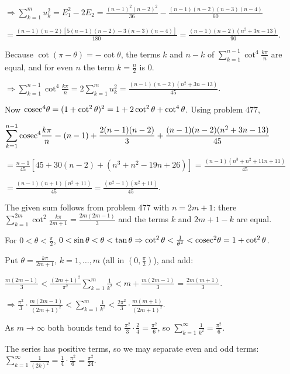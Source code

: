   $\Rightarrow\displaystyle\sum_{k = 1}^mu_k^2 = E_1^2 - 2E_2 = \frac{(n - 1)^2(n - 2)^2}{36} - \frac{(n -
    1)(n - 2)(n - 3)(n - 4)}{60}$

  $= \frac{(n - 1)(n - 2)[5(n - 1)(n - 2) - 3(n - 3)(n - 4)]}{180} = \frac{(n - 1)(n - 2)(n^2 + 3n -
    13)}{90}$.

  Because $\cot(\pi - \theta) = -\cot\theta$, the terms $k$ and $n - k$ of $\displaystyle\sum_{k = 1}^{n -
    1}\cot^4\frac{k\pi}{n}$ are equal, and for even $n$ the term $k = \frac{n}{2}$ is $0$.

  $\Rightarrow\displaystyle\sum_{k = 1}^{n - 1}\cot^4\frac{k\pi}{n} = 2\sum_{k = 1}^mu_k^2 = \frac{(n - 1)(n -
    2)(n^2 + 3n - 13)}{45}$.

  Now ${\rm cosec}^4\theta = (1 + \cot^2\theta)^2 = 1 + 2\cot^2\theta + \cot^4\theta$. Using problem 477,

  $\displaystyle\sum_{k = 1}^{n - 1}{\rm cosec}^4\frac{k\pi}{n} = (n - 1) + \frac{2(n - 1)(n - 2)}{3}
  + \frac{(n - 1)(n - 2)(n^2 + 3n - 13)}{45}$

  $= \frac{n - 1}{45}\left[45 + 30(n - 2) + (n^3 + n^2 - 19n + 26)\right] = \frac{(n - 1)(n^3 + n^2 + 11n +
    11)}{45}$

  $= \frac{(n - 1)(n + 1)(n^2 + 11)}{45} = \frac{(n^2 - 1)(n^2 + 11)}{45}$.
\item The given sum follows from problem 477 with $n = 2m + 1$: there $\displaystyle\sum_{k =
    1}^{2m}\cot^2\frac{k\pi}{2m + 1} = \frac{2m(2m - 1)}{3}$ and the terms $k$ and $2m + 1 - k$ are equal.

  For $0 < \theta < \frac{\pi}{2}$, $0 < \sin\theta < \theta < \tan\theta\Rightarrow\cot^2\theta <
  \frac{1}{\theta^2} < {\rm cosec}^2\theta = 1 + \cot^2\theta$.

  Put $\theta = \frac{k\pi}{2m + 1}$, $k = 1, \ldots, m$ (all in $\left(0, \frac{\pi}{2}\right)$), and add:

  $\frac{m(2m - 1)}{3} < \frac{(2m + 1)^2}{\pi^2}\displaystyle\sum_{k = 1}^m\frac{1}{k^2} < m + \frac{m(2m -
    1)}{3} = \frac{2m(m + 1)}{3}$.

  $\Rightarrow\frac{\pi^2}{3}\cdot\frac{m(2m - 1)}{(2m + 1)^2} < \displaystyle\sum_{k = 1}^m\frac{1}{k^2}
  < \frac{2\pi^2}{3}\cdot\frac{m(m + 1)}{(2m + 1)^2}$.

  As $m\to\infty$ both bounds tend to $\frac{\pi^2}{3}\cdot\frac{2}{4} = \frac{\pi^2}{6}$, so
  $\displaystyle\sum_{k = 1}^\infty\frac{1}{k^2} = \frac{\pi^2}{6}$.

  The series has positive terms, so we may separate even and odd terms: $\displaystyle\sum_{k =
    1}^\infty\frac{1}{(2k)^2} = \frac{1}{4}\cdot\frac{\pi^2}{6} = \frac{\pi^2}{24}$.

